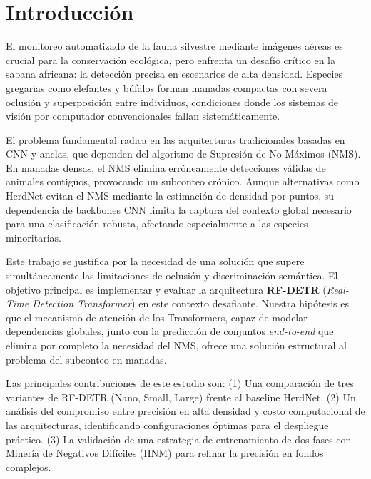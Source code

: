\section{Introducción}
El monitoreo automatizado de la fauna silvestre mediante imágenes aéreas es crucial para la conservación ecológica, pero enfrenta un desafío crítico en la sabana africana: la detección precisa en escenarios de alta densidad. Especies gregarias como elefantes y búfalos forman manadas compactas con severa oclusión y superposición entre individuos, condiciones donde los sistemas de visión por computador convencionales fallan sistemáticamente.

El problema fundamental radica en las arquitecturas tradicionales basadas en CNN y anclas, que dependen del algoritmo de Supresión de No Máximos (NMS). En manadas densas, el NMS elimina erróneamente detecciones válidas de animales contiguos, provocando un subconteo crónico. Aunque alternativas como HerdNet \cite{herdnet} evitan el NMS mediante la estimación de densidad por puntos, su dependencia de backbones CNN limita la captura del contexto global necesario para una clasificación robusta, afectando especialmente a las especies minoritarias.

Este trabajo se justifica por la necesidad de una solución que supere simultáneamente las limitaciones de oclusión y discriminación semántica. El objetivo principal es implementar y evaluar la arquitectura \textbf{RF-DETR} (\textit{Real-Time Detection Transformer}) \cite{rf-detr} en este contexto desafiante. Nuestra hipótesis es que el mecanismo de atención de los Transformers, capaz de modelar dependencias globales, junto con la predicción de conjuntos \textit{end-to-end} que elimina por completo la necesidad del NMS, ofrece una solución estructural al problema del subconteo en manadas.

Las principales contribuciones de este estudio son:  (1) Una comparación de tres variantes de RF-DETR (Nano, Small, Large) frente al baseline HerdNet. (2) Un análisis del compromiso entre precisión en alta densidad y costo computacional de las arquitecturas, identificando configuraciones óptimas para el despliegue práctico. (3) La validación de una estrategia de entrenamiento de dos fases con Minería de Negativos Difíciles (HNM) para refinar la precisión en fondos complejos.

